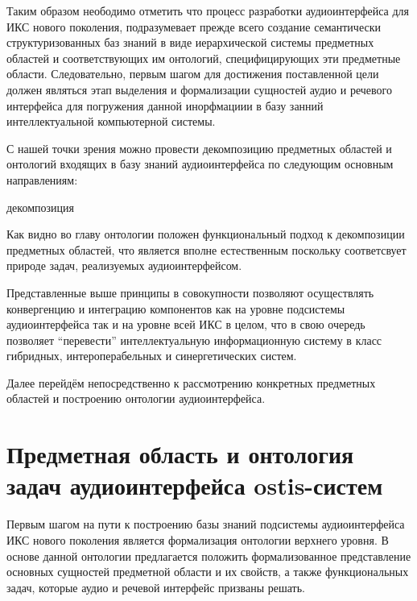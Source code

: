 Таким образом неободимо отметить что процесс разработки аудиоинтерфейса для ИКС нового поколения, подразумевает прежде всего создание семантически структуризованных баз знаний в виде иерархической системы предметных областей и соответствующих им онтологий, специфицирующих эти предметные области. Следовательно, первым шагом для достижения поставленной цели должен являться этап выделения и формализации сущностей аудио и речевого интерфейса для погружения данной инорфмациии в базу занний интеллектуальной компьютерной системы.

С нашей точки зрения можно провести декомпозицию предметных областей и онтологий входящих в базу знаний аудиоинтерфейса по следующим основным направлениям:

\begin{SCn}
	\begin{scnreltoset}{декомпозиция}
	\end{scnreltoset}
\end{SCn}

Как видно во главу онтологии положен функциональный подход к декомпозиции предметных областей, что является вполне естественным поскольку соответсвует природе задач, реализуемых аудиоинтерфейсом.

Представленные выше принципы в совокупности позволяют осуществлять конвергенцию и интеграцию компонентов как на уровне подсистемы аудиоинтерфейса так и на уровне всей ИКС в целом, что в свою очередь позволяет “перевести” интеллектуальную информационную систему в класс гибридных, интероперабельных и синергетических систем.
  
 Далее перейдём непосредственно к рассмотрению конкретных предметных областей и построению онтологии аудиоинтерфейса.

\section{Предметная область и онтология задач аудиоинтерфейса ostis-систем}
Первым шагом на пути к построению базы знаний подсистемы аудиоинтерфейса ИКС нового поколения является формализация онтологии верхнего уровня. В основе данной онтологии предлагается положить формализованное представление основных сущностей предметной области и их свойств, а также функциональных задач, которые аудио и речевой интерфейс призваны решать. 

